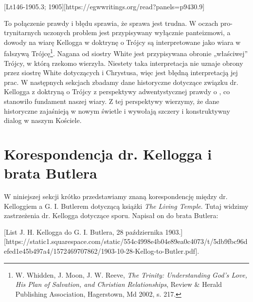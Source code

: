 [Lt146-1905.3; 1905][https://egwwritings.org/read?panels=p9430.9]

To połączenie prawdy i błędu sprawia, że sprawa jest trudna. W oczach pro-trynitarnych uczonych problem jest przypisywany wyłącznie panteizmowi, a dowody na wiarę Kellogga w doktrynę o Trójcy są interpretowane jako wiara w fałszywą Trójcę\footnote{W. Whidden, J. Moon, J. W. Reeve, \textit{The Trinity: Understanding God's Love, His Plan of Salvation, and Christian Relationships}, Review \& Herald Publishing Association, Hagerstown, Md 2002, s. 217.}. Nagana od siostry White jest przypisywana obronie „właściwej” Trójcy, w którą rzekomo wierzyła. Niestety taka interpretacja nie uznaje obrony przez siostrę White  dotyczących  i Chrystusa, więc jest błędną interpretacją jej prac. W następnych sekcjach zbadamy dane historyczne dotyczące związku dr. Kellogga z doktryną o Trójcy z perspektywy adwentystycznej prawdy o , co stanowiło fundament naszej wiary. Z tej perspektywy wierzymy, że dane historyczne zajaśnieją w nowym świetle i wywołają szczery i konstruktywny dialog w naszym Kościele.

\section*{Korespondencja dr. Kellogga i brata Butlera}

W niniejszej sekcji krótko przedstawiamy znaną korespondencję między dr. Kelloggiem a G. I. Butlerem dotyczącą książki \textit{The Living Temple}. Tutaj widzimy zastrzeżenia dr. Kellogga dotyczące sporu. Napisał on do brata Butlera:

[List J. H. Kellogga do G. I. Butlera, 28 października 1903.][https://static1.squarespace.com/static/554c4998e4b04e89ea0c4073/t/5db9fbc96defed1e45b497a4/1572469707862/1903-10-28-Kellog-to-Butler.pdf].

